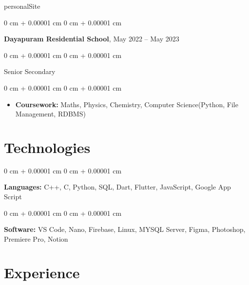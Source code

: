 personalSite\documentclass[10pt, letterpaper]{article}
\newenvironment{highlights}{
    \begin{itemize}[
        topsep=0.10 cm,
        parsep=0.10 cm,
        partopsep=0pt,
        itemsep=0pt,
        leftmargin=0 cm + 10pt
    ]
}{
    \end{itemize}
} %
\newenvironment{onecolentry}{
    \begin{adjustwidth}{
        0 cm + 0.00001 cm
    }{
        0 cm + 0.00001 cm
    }
}{
    \end{adjustwidth}
} %
\newenvironment{twocolentry}[2][]{
    \onecolentry
    \def\secondColumn{#2}
    \setcolumnwidth{\fill, 4.5 cm}
    \begin{paracol}{2}
}{
    \switchcolumn \raggedleft \secondColumn
    \end{paracol}
    \endonecolentry
} %
\begin{document}
        
\vspace{0.2 cm}


                \begin{twocolentry}{
            May 2022 – May 2023
        }
        
            \textbf{Dayapuram Residential School}, \end{twocolentry}
            \begin{onecolentry}
                Senior Secondary
            \end{onecolentry}

        \vspace{0.10 cm}
        \begin{onecolentry}
            \begin{highlights}
                \item \textbf{Coursework:} Maths, Physics, Chemistry, Computer Science(Python, File Management, RDBMS)
            \end{highlights}
        \end{onecolentry}


 \section{Technologies}



        
        \begin{onecolentry}
            \textbf{Languages:} C++, C, Python, SQL, Dart, Flutter, JavaScript, Google App Script
        \end{onecolentry}


        
        \vspace{0.2 cm}

        \begin{onecolentry}
            \textbf{Software:} VS Code, Nano, Firebase, Linux, MYSQL Server, Figma, Photoshop, Premiere Pro, Notion
        \end{onecolentry}
        
    
    \section{Experience}
\end{document}
